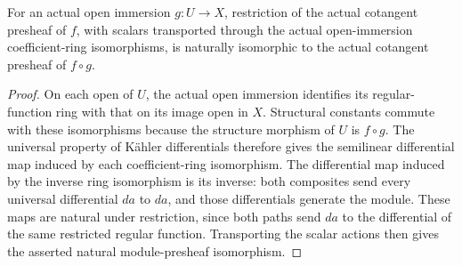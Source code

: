 \begin{theorem}
\label{sc0-canonical-port:geom:cotangent-presheaf-open-immersion-restriction}
\leanok
For an actual open immersion \(g:U\to X\), restriction
of the actual cotangent presheaf of \(f\), with scalars
transported through the actual open-immersion coefficient-ring
isomorphisms, is naturally isomorphic to the actual cotangent
presheaf of \(f\circ g\).
\end{theorem}
\begin{proof}
On each open of \(U\), the actual open immersion identifies
its regular-function ring with that on its image open in \(X\).
Structural constants commute with these isomorphisms because
the structure morphism of \(U\) is \(f\circ g\).
The universal property of K\"ahler differentials therefore gives
the semilinear differential map induced by each coefficient-ring
isomorphism. The differential map induced by the inverse ring
isomorphism is its inverse: both composites send every universal
differential \(da\) to \(da\), and those differentials generate
the module. These maps are natural under restriction, since
both paths send \(da\) to the differential of the same
restricted regular function. Transporting the scalar actions
then gives the asserted natural module-presheaf isomorphism.
\end{proof}

